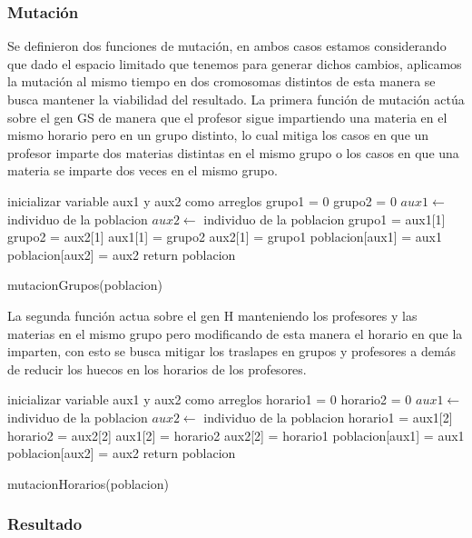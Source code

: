 \subsubsection{Mutaci\'on}

Se definieron dos funciones de mutación, en ambos casos estamos considerando que dado el espacio limitado que tenemos para generar dichos cambios, aplicamos la mutación al mismo tiempo en dos cromosomas distintos de esta manera se busca mantener la viabilidad del resultado. La primera función de mutación  actúa sobre el gen GS de manera que el profesor sigue impartiendo una materia en el mismo horario pero en un grupo distinto, lo cual mitiga los casos en que un profesor imparte dos materias distintas en el mismo grupo o los casos en que una materia se imparte dos veces en el mismo grupo.\\ 


\begin{algorithm}[H]
	\DontPrintSemicolon
	\SetAlgoLined
	inicializar variable aux1 y aux2 como arreglos\;
	grupo1 = 0\;
	grupo2 = 0\;
	$aux1 \leftarrow $ individuo de la poblacion\;
	$aux2 \leftarrow $ individuo de la poblacion\;
	grupo1 = aux1[1]\;
	grupo2 = aux2[1]\;
	aux1[1] = grupo2\;
	aux2[1] = grupo1\;
	poblacion[aux1] = aux1\;
	poblacion[aux2] = aux2\;
	return poblacion \;
	\caption{mutacionGrupos(poblacion)}
\end{algorithm}

La segunda función actua sobre el gen H manteniendo los profesores y las materias en el mismo grupo pero modificando de esta manera el horario en que la imparten, con esto se busca mitigar los traslapes en grupos y profesores a demás de reducir los huecos en los horarios de los profesores.\\

\begin{algorithm}[H]
	\DontPrintSemicolon
	\SetAlgoLined
	inicializar variable aux1 y aux2 como arreglos\;
	horario1 = 0\;
	horario2 = 0\;
	$aux1 \leftarrow $ individuo de la poblacion\;
	$aux2 \leftarrow $ individuo de la poblacion\;
	horario1 = aux1[2]\;
	horario2 = aux2[2]\;
	aux1[2] = horario2\;
	aux2[2] = horario1\;
	poblacion[aux1] = aux1\;
	poblacion[aux2] = aux2\;
	return poblacion \;
	\caption{mutacionHorarios(poblacion)}
	\end{algorithm}  

\subsubsection{Resultado}

